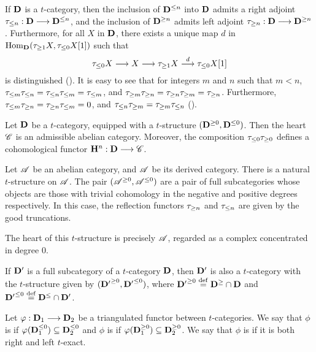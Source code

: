 If $\DCat$ is a $t$-category, then the inclusion of $\DCat^{\leq 
n}$ into $\DCat$ admits a right adjoint $\gltrunc{n}: \DCat \to 
\DCat^{\leq n}$, and the inclusion of $\DCat^{\geq n}$ admits left 
adjoint $\ggtrunc{n}: \DCat \to \DCat^{\geq n}$. Furthermore, for 
all $X$ in $\DCat$, there exists a unique map $d$ in 
$\hom_{\DCat}(\ggtrunc{1}X, \gltrunc{0}X[1])$ such that
\[
\gltrunc{0} X \to X \to \ggtrunc{1} X \stackrel{d}{\to} \gltrunc{0}X[1]
\]
is distinguished (\cite[1.3.3]{BBD}). It is easy to see that for
integers $m$ and $n$ such that $m < n$, $\gltrunc{m} \gltrunc{n} =
\gltrunc{n}\gltrunc{m} = \gltrunc{m}$, and $\ggtrunc{m} 
\ggtrunc{n} = \ggtrunc{n} \ggtrunc{m} = \ggtrunc{n}$. Furthermore, 
$\gltrunc{m} \ggtrunc{n} = \ggtrunc{n} \gltrunc{m} = 0$, and
$\gltrunc{n} \ggtrunc{m} = \ggtrunc{m} \gltrunc{n}$ 
(\cite[1.3.5]{BBD}). 

\begin{thm}\label{thm_heart_is_abel_cat}
Let $\DCat$ be a $t$-category, equipped with a $t$-structure 
$(\DCat^{\geq 0}, \DCat^{\leq 0})$. Then the heart $\Cat{C}$ is an 
admissible abelian category. Moreover, the composition 
$\gltrunc{0} \ggtrunc{0}$ defines a cohomological functor 
$\HH^n : \DCat \to \Cat{C}$.
\end{thm}

\begin{ex}\label{ex_DA_t_struct}
Let $\Cat{A}$ be an abelian category, and $\DCat[\Cat{A}]$ be its
derived category. There is a natural $t$-structure on 
$\DCat[\Cat{A}]$. The pair $(\DCat[\Cat{A}]^{\geq 0}, 
\DCat[\Cat{A}]^{\leq 0})$ are a pair of full subcategories whose
objects are those with trivial cohomology in the negative and 
positive degrees respectively. In this case, the reflection 
functors $\ggtrunc{n}$ and $\gltrunc{n}$ are given by the good
truncations. 

The heart of this $t$-structure is precisely $\Cat{A}$, regarded
as a complex concentrated in degree $0$.
\end{ex}

\begin{ex}
If $\DCat'$ is a full subcategory of a $t$-category $\DCat$, then
$\DCat'$ is also a $t$-category with the $t$-structure given by
$({\DCat'}^{\geq 0}, {\DCat'}^{\leq 0})$, where ${\DCat'}^{\geq 0} 
\defeq \DCat^{\geq} \cap \DCat$ and ${\DCat'}^{\leq 0} \defeq 
\DCat^{\leq} \cap \DCat'$. 
\end{ex}

\begin{defn}
Let $\phi: \DCat_1 \to \DCat_2$ be a triangulated functor between
$t$-categories. We say that $\phi$ is  if 
$\phi(\DCat_1^{\leq 0}) \subseteq \DCat_2^{\leq 0}$ and $\phi$ is 
 if $\phi(\DCat_1^{\geq 0}) \subseteq 
\DCat_2^{\geq 0}$. We say that $\phi$ is  
if it is both right and left $t$-exact.
\end{defn}

